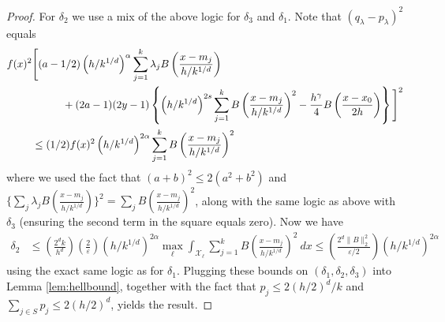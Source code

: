 \documentclass[11pt,twoside]{article}
\theoremstyle{definition}
\theoremstyle{remark}
\begin{document}
\begin{proof}
For $\delta_2$ we use a mix of the above logic for $\delta_3$ and $\delta_1$. Note that $({q}_\lambda - p_\lambda)^2$ equals
\begin{align*}
 f(x)^2 & \Bigg[  (a-1/2) \left( h/k^{1/d} \right)^\alpha \sum_{j=1}^k \lambda_j B \left( \frac{x-m_j}{h/k^{1/d}}  \right)  \\
& \hspace{.4in} + (2a-1)(2y-1) \left\{ \left( h/k^{1/d} \right)^{2s} \sum_{j=1}^k B \left( \frac{x-m_j}{h/k^{1/d}}  \right)^2  -  \frac{h^\gamma}{4} B\left( \frac{x-x_0}{2h} \right)   \right\} \Bigg]^2  \\
& \leq (1/2) f(x)^2  \left( h/k^{1/d} \right)^{2\alpha} \sum_{j=1}^k B \left( \frac{x-m_j}{h/k^{1/d}}  \right)^2  
\end{align*}
where we used the fact that $(a+b)^2 \leq 2(a^2+b^2)$ and $\{ \sum_j \lambda_j B \left( \frac{x-m_j}{h/k^{1/d}}  \right) \}^2 = \sum_j B \left( \frac{x-m_j}{h/k^{1/d}}  \right)^2$, along with the  same logic as above with $\delta_3$ (ensuring the second term in the square equals zero). Now we have 
\begin{align*}
\delta_2 %
&\leq \left( \frac{2^d k}{h^d} \right) \left( \frac{2}{\varepsilon} \right)   \left( h/k^{1/d} \right)^{2\alpha} \max_\ell \int_{\mathcal{X}_\ell}  \sum_{j=1}^k B \left( \frac{x-m_j}{h/k^{1/d}}  \right)^2 \ dx 
 \leq \left( \frac{2^d \|B \|_2^2}{\varepsilon/2} \right) \left( h/k^{1/d} \right)^{2\alpha}
\end{align*}
using the exact same logic as for $\delta_1$. Plugging these bounds on $(\delta_1,\delta_2,\delta_3)$ into Lemma \ref{lem:hellbound}, together with the fact that $p_j\leq 2(h/2)^d/k$ and $\sum_{j \in S} p_j \leq 2 (h/2)^d$, yields the result. 
\end{proof}
\end{document}
